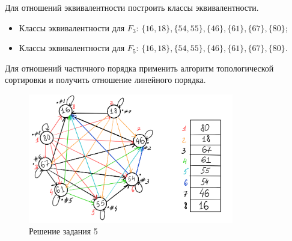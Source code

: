 \documentclass[a4paper, 14pt]{article}
\begin{document}
\begin{problem}
    Для отношений эквивалентности построить классы эквивалентности.
\end{problem}

\begin{itemize}
    \item Классы эквивалентности для $F_3$: $ \{ 16, 18 \}, \{ 54, 55 \},\{ 46 \},\{ 61 \},\{ 67 \},\{ 80 \}$;
    \item Классы эквивалентности для $F_5$: $ \{ 16, 18 \}, \{ 54, 55 \},\{ 46 \},\{ 61 \},\{ 67 \},\{ 80 \}$.
\end{itemize}

\begin{problem}
    Для отношений частичного порядка применить алгоритм топологической сортировки и получить отношение линейного порядка.
\end{problem}

\begin{figure}[h!]
    \centering
    \includegraphics[width=0.8\textwidth]{task5.png}
    \caption{Решение задания 5}
    \label{Рисунок:6}
\end{figure}
\end{document}
